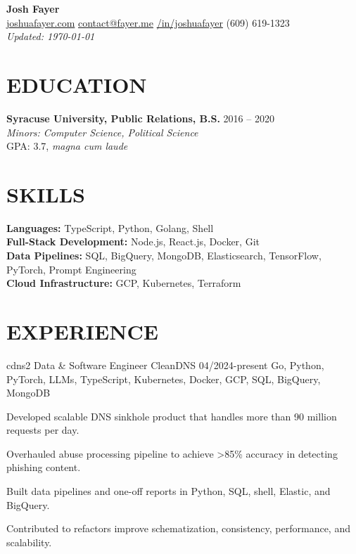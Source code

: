 \documentclass[letterpaper,10pt]{article}
\begin{document}
\begin{center}
    {\huge\textbf{Josh Fayer}} \\
        \href{https://joshuafayer.com}{joshuafayer.com} \quad
        \href{mailto:contact@fayer.me}{contact@fayer.me} \quad
        \href{https://linkedin.com/in/joshuafayer}{/in/joshuafayer} \quad (609) 619-1323 \\
        \emph{Updated: \monthyear\today}
\end{center}

\vspace{0.1cm}

\section*{EDUCATION}
\noindent\textbf{Syracuse University, Public Relations, B.S.} \hfill 2016 -- 2020 \\
\emph{Minors: Computer Science, Political Science} \\
GPA: 3.7, \emph{magna cum laude}

\section*{SKILLS}
\noindent\textbf{Languages:} TypeScript, Python, Golang, Shell \\
\noindent\textbf{Full-Stack Development:} Node.js, React.js, Docker, Git \\
\noindent\textbf{Data Pipelines:} SQL, BigQuery, MongoDB, Elasticsearch, TensorFlow, PyTorch, Prompt Engineering \\
\textbf{Cloud Infrastructure:} GCP, Kubernetes, Terraform

\section*{EXPERIENCE}

\jobentry
    {cdns2}
    {Data \& Software Engineer}
    {CleanDNS}
    {04/2024-present}
    {Go, Python, PyTorch, LLMs, TypeScript, Kubernetes, Docker, GCP, SQL, BigQuery, MongoDB}
    {
        \item Developed scalable DNS sinkhole product that handles more than 90 million requests per day.
        \item Overhauled abuse processing pipeline to achieve >85\% accuracy in detecting phishing content.
        \item Built data pipelines and one-off reports in Python, SQL, shell, Elastic, and BigQuery.
        \item Contributed to refactors improve schematization, consistency, performance, and scalability.
    }
\end{document}
